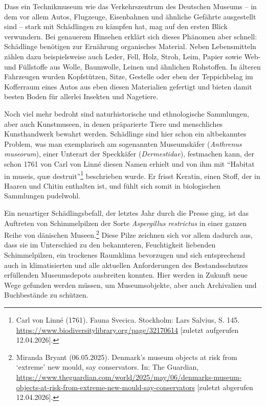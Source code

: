 \documentclass[a4paper,
fontsize=11pt,
oneside,
numbers=noperiodatend,
parskip=half-,
bibliography=totoc,
final
]{scrartcl}
\begin{document}
Dass ein Technikmuseum wie das Verkehrszentrum des Deutschen Museums --
in dem vor allem Autos, Flugzeuge, Eisenbahnen und ähnliche Gefährte
ausgestellt sind -- stark mit Schädlingen zu kämpfen hat, mag auf den
ersten Blick verwundern. Bei genauerem Hinsehen erklärt sich dieses
Phänomen aber schnell: Schädlinge benötigen zur Ernährung organisches
Material. Neben Lebensmitteln zählen dazu beispielsweise auch Leder,
Fell, Holz, Stroh, Leim, Papier sowie Web- und Füllstoffe aus Wolle,
Baumwolle, Leinen und ähnlichen Rohstoffen. In älteren Fahrzeugen wurden
Kopfstützen, Sitze, Gestelle oder eben der Teppichbelag im Kofferraum
eines Autos aus eben diesen Materialien gefertigt und bieten damit
besten Boden für allerlei Insekten und Nagetiere.

Noch viel mehr bedroht sind naturhistorische und ethnologische
Sammlungen, aber auch \linebreak Kunstmuseen, in denen präparierte Tiere und
menschliches Kunsthandwerk bewahrt werden. Schädlinge sind hier schon
ein altbekanntes Problem, was man exemplarisch am sogenannten
Museumskäfer (\emph{Anthrenus museorum}), einer Unterart der Speckkäfer
(\emph{Dermestidae}), festmachen kann, der schon 1761 von Carl von Linné
diesen Namen erhielt und von ihm mit \enquote{Habitat in museis, quæ
destruit}\footnote{Carl von Linné (1761). Fauna Svecica. Stockholm: Lars
  Salvius, S. 145.
  \url{https://www.biodiversitylibrary.org/page/32170614} {[}zuletzt
  aufgerufen 12.04.2026{]}.} beschrieben wurde. Er frisst Keratin, einen
Stoff, der in Haaren und Chitin enthalten ist, und fühlt sich somit in
biologischen Sammlungen pudelwohl.

Ein neuartiger Schädlingsbefall, der letztes Jahr durch die Presse ging,
ist das Auftreten von Schimmelpilzen der Sorte \emph{Aspergillus
restrictus} in einer ganzen Reihe von dänischen Museen.\footnote{Miranda
  Bryant (06.05.2025). Denmark's museum objects at risk from
  \enquote*{extreme} new mould, say conservators. In: The Guardian,
  \url{https://www.theguardian.com/world/2025/may/06/denmarks-museum-objects-at-risk-from-extreme-new-mould-say-conservators}
  {[}zuletzt abgerufen 12.04.2026{]}.} Diese Pilze zeichnen sich vor
allem dadurch aus, dass sie im Unterschied zu den bekannteren,
Feuchtigkeit liebenden Schimmelpilzen, ein trockenes Raumklima
bevorzugen und sich entsprechend auch in klimatisierten und alle
aktuellen Anforderungen des Bestandsschutzes erfüllenden Museumsdepots
ausbreiten konnten. Hier werden in Zukunft neue Wege gefunden werden
müssen, um Museumsobjekte, aber auch Archivalien und Buchbestände zu
schützen.
\end{document}
